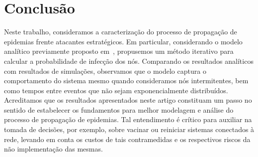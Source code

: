 
\chapter{Conclusão}
\label{cap:conclusao}


Neste trabalho, consideramos a  caracterização do processo de propagação de epidemias frente atacantes estratégicos. Em particular, considerando o modelo analítico previamente proposto em~\cite{rufino2018contaminaccao, rufino2019dilemas},  propusemos um método iterativo para calcular a probabilidade de infecção dos nós.   Comparando os resultados analíticos  com resultados de simulações, observamos que o modelo captura o comportamento do sistema mesmo quando consideramos nós intermitentes, bem como tempos entre eventos que não sejam exponencialmente distribuídos. Acreditamos que os resultados apresentados neste artigo constituam um passo no sentido de estabelecer os fundamentos para melhor modelagem e análise   do processo de propagação de epidemias.  Tal entendimento é crítico para auxiliar na tomada de decisões, por exemplo, sobre vacinar ou reiniciar sistemas conectados à rede, levando em conta os custos de tais contramedidas e os respectivos riscos da não implementação das mesmas.
